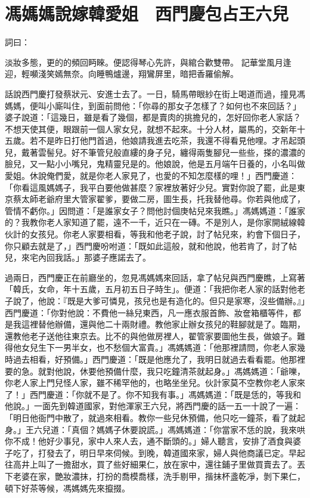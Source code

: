 %

\chapter{馮媽媽說嫁韓愛姐　西門慶包占王六兒}

詞曰：

淡妝多態，更的的頻回眄睞。便認得琴心先許，與綰合歡雙帶。
記華堂風月逢迎，輕嚬淺笑嫣無奈。向睡鴨爐邊，翔鸞屏里，暗把香羅偷解。

話說西門慶打發蔡狀元、安進士去了。一日，騎馬帶眼紗在街上喝道而過，撞見馮媽媽，便叫小廝叫住，到面前問他：「你尋的那女子怎樣了？如何也不來回話？」 婆子說道：「這幾日，雖是看了幾個，都是賣肉的挑擔兒的，怎好回你老人家話？不想天使其便，眼跟前一個人家女兒，就想不起來。十分人材，屬馬的，交新年十五歲。若不是昨日打他門首過，他娘請我進去吃茶，我還不得看見他哩。才吊起頭兒，戴著雲髻兒。好不筆管兒般直縷的身子兒，纏得兩隻腳兒一些些，搽的濃濃的臉兒，又一點小小嘴兒，鬼精靈兒是的。他娘說，他是五月端午日養的，小名叫做愛姐。休說俺們愛，就是你老人家見了，也愛的不知怎麼樣的哩！」西門慶道： 「你看這風媽媽子，我平白要他做甚麼？家裡放著好少兒。實對你說了罷，此是東京蔡太師老爺府里大管家翟爹，要做二房，圖生長，托我替他尋。你若與他成了，管情不虧你。」因問道：「是誰家女子？問他討個庚帖兒來我瞧。」馮媽媽道：「誰家的？我教你老人家知道了罷，遠不一千，近只在一磚。不是別人，是你家開絨線韓伙計的女孩兒。你老人家要相看，等我和他老子說，討了帖兒來，約會下個日子，你只顧去就是了，」西門慶吩咐道：「既如此這般，就和他說，他若肯了，討了帖兒，來宅內回我話。」那婆子應諾去了。

過兩日，西門慶正在前廳坐的，忽見馮媽媽來回話，拿了帖兒與西門慶瞧，上寫著「韓氏，女命，年十五歲，五月初五日子時生」。便道：「我把你老人家的話對他老子說了，他說：『既是大爹可憐見，孩兒也是有造化的。但只是家寒，沒些備辦。』」西門慶道：「你對他說：不費他一絲兒東西，凡一應衣服首飾、妝奩箱櫃等件，都是我這裡替他辦備，還與他二十兩財禮。教他家止辦女孩兒的鞋腳就是了。臨期，還教他老子送他往東京去。比不的與他做房裡人，翟管家要圖他生長，做娘子。難得他女兒生下一男半女，也不愁個大富貴。」馮媽媽道：「他那裡請問，你老人家幾時過去相看，好預備。」西門慶道：「既是他應允了，我明日就過去看看罷。他那裡要的急。就對他說，休要他預備什麼，我只吃鐘清茶就起身。」馮媽媽道：「爺嚛，你老人家上門兒怪人家，雖不稀罕他的，也略坐坐兒。伙計家莫不空教你老人家來了！」西門慶道：「你就不是了。你不知我有事。」馮媽媽道：「既是恁的，等我和他說。」一面先到韓道國家，對他渾家王六兒，將西門慶的話一五一十說了一遍：「明日他衙門中散了，就過來相看。教你一些兒休預備，他只吃一鐘茶，看了就起身。」王六兒道：「真個？媽媽子休要說謊。」馮媽媽道：「你當家不恁的說，我來哄你不成！他好少事兒，家中人來人去，通不斷頭的。」婦人聽言，安排了酒食與婆子吃了，打發去了，明日早來伺候。到晚，韓道國來家，婦人與他商議已定。早起往高井上叫了一擔甜水，買了些好細果仁，放在家中，還往鋪子里做買賣去了。丟下老婆在家，艷妝濃抹，打扮的喬模喬樣，洗手剔甲，揩抹杯盞乾凈，剝下果仁，頓下好茶等候，馮媽媽先來攛掇。

